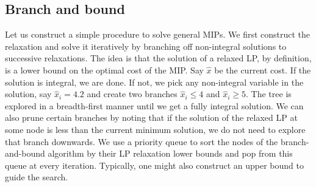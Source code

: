 \documentclass[letterpaper, 10pt, twocolumn, reqno]{amsart}
\begin{document}
\subsection{Branch and bound}
\label{ssec:branch_and_bound}

Let us construct a simple procedure to solve general MIPs. We first construct
the relaxation and solve it iteratively by branching off non-integral solutions to successive relaxations. The idea is that the solution of a
relaxed LP, by definition, is a lower bound on the optimal cost of the MIP. Say $\hat{x}$ be the current cost. If the solution is integral, we are done. If not, we pick any non-integral variable in the solution, say $\hat{x}_i = 4.2$ and create two branches $\hat{x}_i \leq 4$ and $\hat{x}_i \geq 5$. The tree
is explored in a breadth-first manner until we get a fully integral solution. We can also prune certain branches by noting that if the solution of the
relaxed LP at some node is less than the current minimum solution, we do not need to explore that branch downwards. We use a priority queue to sort the nodes of the branch-and-bound algorithm by their LP relaxation lower bounds and pop from this queue at every iteration. Typically, one might also construct an upper bound to guide the search.

\end{document}
